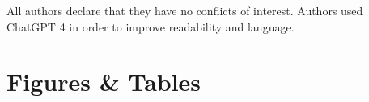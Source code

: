 \documentclass[fleqn,10pt]{wlscirep}
\begin{document}

All authors declare that they have no conflicts of interest. Authors used ChatGPT 4 in order to improve readability and language.


\section*{Figures \& Tables}






\end{document}
